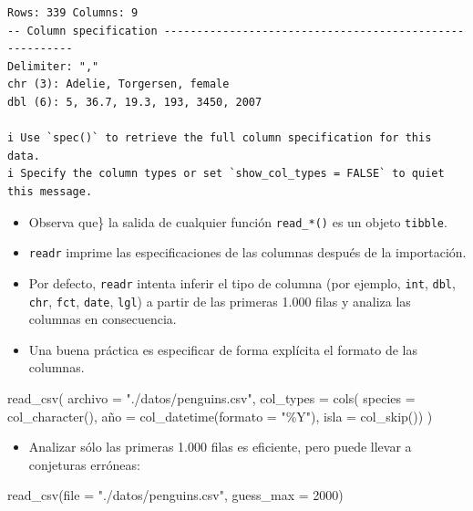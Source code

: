 \documentclass[
  letterpaper,
  DIV=11,
  numbers=noendperiod]{scrreprt}
\newenvironment{Shaded}{\begin{snugshade}}{\end{snugshade}}
\newcommand{\AttributeTok}[1]{\textcolor[rgb]{0.40,0.45,0.13}{#1}}
\newcommand{\DecValTok}[1]{\textcolor[rgb]{0.68,0.00,0.00}{#1}}
\newcommand{\FunctionTok}[1]{\textcolor[rgb]{0.28,0.35,0.67}{#1}}
\newcommand{\NormalTok}[1]{\textcolor[rgb]{0.00,0.23,0.31}{#1}}
\newcommand{\OtherTok}[1]{\textcolor[rgb]{0.00,0.23,0.31}{#1}}
\newcommand{\StringTok}[1]{\textcolor[rgb]{0.13,0.47,0.30}{#1}}
\providecommand{\tightlist}{%
  \setlength{\itemsep}{0pt}\setlength{\parskip}{0pt}}\usepackage{longtable,booktabs,array}
\begin{document}
\begin{verbatim}
Rows: 339 Columns: 9
-- Column specification --------------------------------------------------------
Delimiter: ","
chr (3): Adelie, Torgersen, female
dbl (6): 5, 36.7, 19.3, 193, 3450, 2007

i Use `spec()` to retrieve the full column specification for this data.
i Specify the column types or set `show_col_types = FALSE` to quiet this message.
\end{verbatim}

\begin{itemize}
\item
  Observa que\} la salida de cualquier función \texttt{read\_*()} es un
  objeto \texttt{tibble}.
\item
  \texttt{readr} imprime las especificaciones de las columnas después de
  la importación.
\item
  Por defecto, \texttt{readr} intenta inferir el tipo de columna (por
  ejemplo, \texttt{int}, \texttt{dbl}, \texttt{chr}, \texttt{fct},
  \texttt{date}, \texttt{lgl}) a partir de las primeras 1.000 filas y
  analiza las columnas en consecuencia.
\item
  Una buena práctica es especificar de forma explícita el formato de las
  columnas.
\end{itemize}

\begin{Shaded}
\begin{Highlighting}[]
\FunctionTok{read\_csv}\NormalTok{(}
  \AttributeTok{archivo =} \StringTok{"./datos/penguins.csv"}\NormalTok{,}
  \AttributeTok{col\_types =} \FunctionTok{cols}\NormalTok{(}
    \AttributeTok{species =} \FunctionTok{col\_character}\NormalTok{(),}
\NormalTok{    año }\OtherTok{=} \FunctionTok{col\_datetime}\NormalTok{(}\AttributeTok{formato =} \StringTok{"\%Y"}\NormalTok{),}
    \AttributeTok{isla =} \FunctionTok{col\_skip}\NormalTok{())}
\NormalTok{  )}
\end{Highlighting}
\end{Shaded}

\begin{itemize}
\tightlist
\item
  Analizar sólo las primeras 1.000 filas es eficiente, pero puede llevar
  a conjeturas erróneas:
\end{itemize}

\begin{Shaded}
\begin{Highlighting}[]
\FunctionTok{read\_csv}\NormalTok{(}\AttributeTok{file =} \StringTok{"./datos/penguins.csv"}\NormalTok{, }\AttributeTok{guess\_max =} \DecValTok{2000}\NormalTok{)}
\end{Highlighting}
\end{Shaded}
\end{document}
